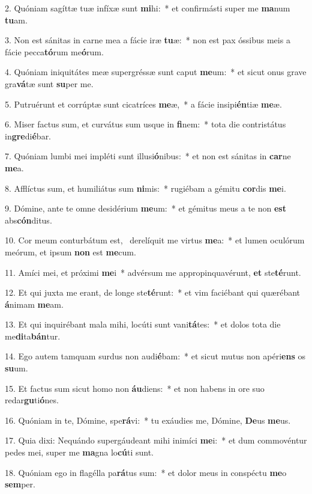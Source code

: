 2. Quóniam sagíttæ tuæ infíxæ sunt \textbf{mi}hi:~*  et confirmásti super me \textbf{ma}num \textbf{tu}am.\

3. Non est sánitas in carne mea a fácie iræ \textbf{tu}æ:~*  non est pax óssibus meis a fácie pecca\textbf{tó}rum me\textbf{ó}rum.\

4. Quóniam iniquitátes meæ supergréssæ sunt caput \textbf{me}um:~*  et sicut onus grave gra\textbf{vá}tæ sunt \textbf{su}per me.\

5. Putruérunt et corrúptæ sunt cicatríces \textbf{me}æ,~*  a fácie insipi\textbf{én}tiæ \textbf{me}æ.\

6. Miser factus sum, et curvátus sum usque in \textbf{fi}nem:~*  tota die contristátus in\textbf{gre}di\textbf{é}bar.\

7. Quóniam lumbi mei impléti sunt illusi\textbf{ó}nibus:~*  et non est sánitas in \textbf{car}ne \textbf{me}a.\

8. Afflíctus sum, et humiliátus sum \textbf{ni}mis:~*  rugiébam a gémitu \textbf{cor}dis \textbf{me}i.\

9. Dómine, ante te omne desidérium \textbf{me}um:~*  et gémitus meus a te non \textbf{est} abs\textbf{cón}ditus.\

10. Cor meum conturbátum est, \dag\  derelíquit me virtus \textbf{me}a:~*  et lumen oculórum meórum, et ipsum \textbf{non} est \textbf{me}cum.\

11. Amíci mei, et próximi \textbf{me}i~*  advérsum me appropinquavérunt, \textbf{et} ste\textbf{té}runt.\

12. Et qui juxta me erant, de longe ste\textbf{té}runt:~*  et vim faciébant qui quærébant \textbf{á}nimam \textbf{me}am.\

13. Et qui inquirébant mala mihi, locúti sunt vani\textbf{tá}tes:~*  et dolos tota die me\textbf{di}ta\textbf{bán}tur.\

14. Ego autem tamquam surdus non audi\textbf{é}bam:~*  et sicut mutus non apéri\textbf{ens} os \textbf{su}um.\

15. Et factus sum sicut homo non \textbf{áu}diens:~*  et non habens in ore suo redar\textbf{gu}ti\textbf{ó}nes.\

16. Quóniam in te, Dómine, spe\textbf{rá}vi:~*  tu exáudies me, Dómine, \textbf{De}us \textbf{me}us.\

17. Quia dixi: Nequándo supergáudeant mihi inimíci \textbf{me}i:~*  et dum commovéntur pedes mei, super me \textbf{ma}gna lo\textbf{cú}ti sunt.\

18. Quóniam ego in flagélla pa\textbf{rá}tus sum:~*  et dolor meus in conspéctu \textbf{me}o \textbf{sem}per.\

